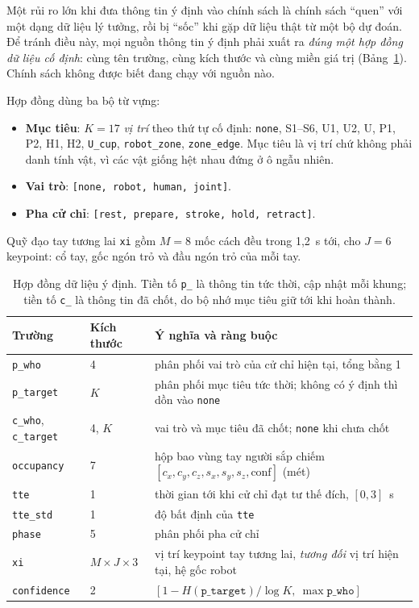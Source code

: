 Một rủi ro lớn khi đưa thông tin ý định vào chính sách là chính sách ``quen'' với một dạng dữ liệu lý tưởng, rồi bị ``sốc'' khi gặp dữ liệu thật từ một bộ dự đoán. Để tránh điều này, mọi nguồn thông tin ý định phải xuất ra \emph{đúng một hợp đồng dữ liệu cố định}: cùng tên trường, cùng kích thước và cùng miền giá trị (Bảng~\ref{tab:contract}). Chính sách không được biết đang chạy với nguồn nào.

Hợp đồng dùng ba bộ từ vựng:
\begin{itemize}
  \item \textbf{Mục tiêu}: $K = 17$ \emph{vị trí} theo thứ tự cố định: \texttt{none}, S1--S6, U1, U2, U, P1, P2, H1, H2, \texttt{U\_cup}, \texttt{robot\_zone}, \texttt{zone\_edge}. Mục tiêu là vị trí chứ không phải danh tính vật, vì các vật giống hệt nhau đứng ở ô ngẫu nhiên.
  \item \textbf{Vai trò}: \texttt{[none, robot, human, joint]}.
  \item \textbf{Pha cử chỉ}: \texttt{[rest, prepare, stroke, hold, retract]}.
\end{itemize}

Quỹ đạo tay tương lai \texttt{xi} gồm $M = 8$ mốc cách đều trong 1,2~s tới, cho $J = 6$ keypoint: cổ tay, gốc ngón trỏ và đầu ngón trỏ của mỗi tay.

\begin{table}[htbp]
  \centering
  \caption{Hợp đồng dữ liệu ý định. Tiền tố \texttt{p\_} là thông tin tức thời, cập nhật mỗi khung; tiền tố \texttt{c\_} là thông tin đã chốt, do bộ nhớ mục tiêu giữ tới khi hoàn thành.}
  \label{tab:contract}
  \small
  \begin{tabularx}{\textwidth}{@{}l l X@{}}
    \toprule
    \textbf{Trường} & \textbf{Kích thước} & \textbf{Ý nghĩa và ràng buộc} \\
    \midrule
    \texttt{p\_who} & 4 & phân phối vai trò của cử chỉ hiện tại, tổng bằng 1 \\
    \texttt{p\_target} & $K$ & phân phối mục tiêu tức thời; không có ý định thì dồn vào \texttt{none} \\
    \texttt{c\_who}, \texttt{c\_target} & 4, $K$ & vai trò và mục tiêu đã chốt; \texttt{none} khi chưa chốt \\
    \texttt{occupancy} & 7 & hộp bao vùng tay người sắp chiếm $[c_x, c_y, c_z, s_x, s_y, s_z, \text{conf}]$ (mét) \\
    \texttt{tte} & 1 & thời gian tới khi cử chỉ đạt tư thế đích, $[0, 3]$~s \\
    \texttt{tte\_std} & 1 & độ bất định của \texttt{tte} \\
    \texttt{phase} & 5 & phân phối pha cử chỉ \\
    \texttt{xi} & $M \times J \times 3$ & vị trí keypoint tay tương lai, \emph{tương đối} vị trí hiện tại, hệ gốc robot \\
    \texttt{confidence} & 2 & $\left[1 - H(\texttt{p\_target})/\log K,\ \max \texttt{p\_who}\right]$ \\
    \bottomrule
  \end{tabularx}
\end{table}

